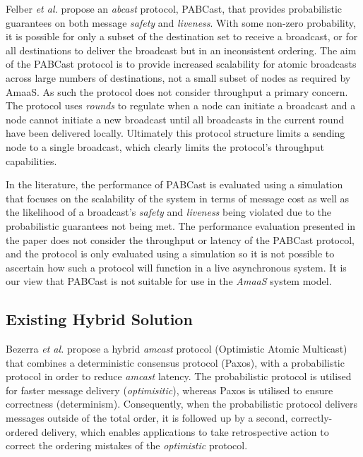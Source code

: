     Felber \emph{et al.} \citep{Felber01probabilisticatomic} propose an \emph{abcast} protocol, \textsf{PABCast}, that provides probabilistic guarantees on both message \emph{safety} and \emph{liveness}.  With some non-zero probability, it is possible for only a subset of the destination set to receive a broadcast, or for all destinations to deliver the broadcast but in an inconsistent ordering.  The aim of the  \textsf{PABCast} protocol is to provide increased scalability for atomic broadcasts across large numbers of destinations, not a small subset of nodes as required by \textsf{AmaaS}.  As such the protocol does not consider throughput a primary concern.  The protocol uses \emph{rounds} to regulate when a node can initiate a broadcast and a node cannot initiate a new broadcast until all broadcasts in the current round have been delivered locally.  Ultimately this protocol structure limits a sending node to a single broadcast, which clearly limits the protocol's throughput capabilities.  
    
    In the literature, the performance of \textsf{PABCast} is evaluated using a simulation that focuses on the scalability of the system in terms of message cost as well as the likelihood of a broadcast's \emph{safety} and \emph{liveness} being violated due to the probabilistic guarantees not being met. The performance evaluation presented in the paper does not consider the throughput or latency of the \textsf{PABCast} protocol, and the protocol is only evaluated using a simulation so it is not possible to ascertain how such a protocol will function in a live asynchronous system.  It is our view that \textsf{PABCast} is not suitable for use in the \emph{AmaaS} system model.  
    
    
    \subsection{Existing Hybrid Solution}
    Bezerra \emph{et al.}\citep{6681607} propose a hybrid \emph{amcast} protocol (Optimistic Atomic Multicast) that combines a deterministic consensus protocol (Paxos), with a probabilistic protocol in order to reduce \emph{amcast} latency.  The probabilistic protocol is utilised for faster message delivery (\emph{optimisitic}), whereas Paxos is utilised to ensure correctness (determinism).  Consequently, when the probabilistic protocol delivers messages outside of the total order, it is followed up by a second, correctly-ordered delivery, which enables applications to take retrospective action to correct the ordering mistakes of the \emph{optimistic} protocol.  
    

